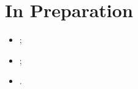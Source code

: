 \documentclass[a4paper]{article}
\begin{document}
  
  \section*{In Preparation}
	  \begin{itemize}
    	\item {};
		\item {};
    	\item {}.
	  \end{itemize}

  
\end{document}
